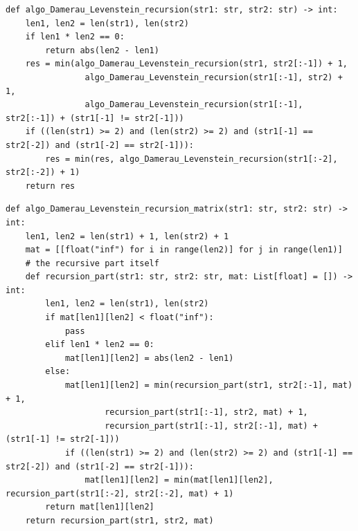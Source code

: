 \begin{lstlisting}[caption=реализация рекурсивного алгоритма Дамерау-Левенштейна]
def algo_Damerau_Levenstein_recursion(str1: str, str2: str) -> int:
    len1, len2 = len(str1), len(str2)
    if len1 * len2 == 0:
        return abs(len2 - len1)
    res = min(algo_Damerau_Levenstein_recursion(str1, str2[:-1]) + 1,
                algo_Damerau_Levenstein_recursion(str1[:-1], str2) + 1,
                algo_Damerau_Levenstein_recursion(str1[:-1], str2[:-1]) + (str1[-1] != str2[-1]))
    if ((len(str1) >= 2) and (len(str2) >= 2) and (str1[-1] == str2[-2]) and (str1[-2] == str2[-1])):
        res = min(res, algo_Damerau_Levenstein_recursion(str1[:-2], str2[:-2]) + 1)
    return res
\end{lstlisting}
\begin{lstlisting}[caption=реализация рекурсивно-матричного алгоритма Дамерау-Левенштейна]
def algo_Damerau_Levenstein_recursion_matrix(str1: str, str2: str) -> int:
    len1, len2 = len(str1) + 1, len(str2) + 1
    mat = [[float("inf") for i in range(len2)] for j in range(len1)]
    # the recursive part itself
    def recursion_part(str1: str, str2: str, mat: List[float] = []) -> int:
        len1, len2 = len(str1), len(str2)
        if mat[len1][len2] < float("inf"):
            pass
        elif len1 * len2 == 0:
            mat[len1][len2] = abs(len2 - len1)
        else:
            mat[len1][len2] = min(recursion_part(str1, str2[:-1], mat) + 1,
                    recursion_part(str1[:-1], str2, mat) + 1,
                    recursion_part(str1[:-1], str2[:-1], mat) + (str1[-1] != str2[-1]))
            if ((len(str1) >= 2) and (len(str2) >= 2) and (str1[-1] == str2[-2]) and (str1[-2] == str2[-1])):
                mat[len1][len2] = min(mat[len1][len2], recursion_part(str1[:-2], str2[:-2], mat) + 1)
        return mat[len1][len2]
    return recursion_part(str1, str2, mat)
\end{lstlisting}
